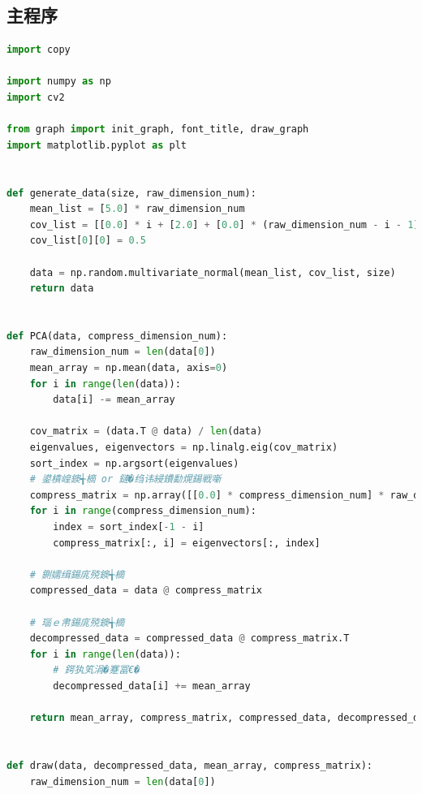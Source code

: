 \documentclass[withoutpreface,bwprint]{cumcmthesis}
\begin{document}
\newpage
\begin{appendix}
\section{主程序}
\begin{lstlisting}[language=python]
import copy

import numpy as np
import cv2

from graph import init_graph, font_title, draw_graph
import matplotlib.pyplot as plt


def generate_data(size, raw_dimension_num):
    mean_list = [5.0] * raw_dimension_num
    cov_list = [[0.0] * i + [2.0] + [0.0] * (raw_dimension_num - i - 1) for i in range(raw_dimension_num)]
    cov_list[0][0] = 0.5

    data = np.random.multivariate_normal(mean_list, cov_list, size)
    return data


def PCA(data, compress_dimension_num):
    raw_dimension_num = len(data[0])
    mean_array = np.mean(data, axis=0)
    for i in range(len(data)):
        data[i] -= mean_array

    cov_matrix = (data.T @ data) / len(data)
    eigenvalues, eigenvectors = np.linalg.eig(cov_matrix)
    sort_index = np.argsort(eigenvalues)
    # 鍙樻崲鐭╅樀 or 鏈�绉讳綅鐨勫熀鍚戦噺
    compress_matrix = np.array([[0.0] * compress_dimension_num] * raw_dimension_num)
    for i in range(compress_dimension_num):
        index = sort_index[-1 - i]
        compress_matrix[:, i] = eigenvectors[:, index]

    # 鍘嬬缉鍚庣殑鐭╅樀
    compressed_data = data @ compress_matrix

    # 瑙ｅ帇鍚庣殑鐭╅樀
    decompressed_data = compressed_data @ compress_matrix.T
    for i in range(len(data)):
        # 鍔犱笂涓�蹇冨€�
        decompressed_data[i] += mean_array

    return mean_array, compress_matrix, compressed_data, decompressed_data


def draw(data, decompressed_data, mean_array, compress_matrix):
    raw_dimension_num = len(data[0])


\end{lstlisting}
\end{appendix}
\end{document}

